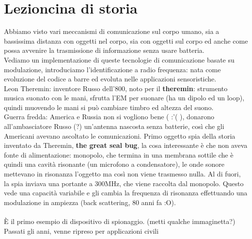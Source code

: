 \documentclass[oneside, 12pt]{extbook}
\begin{document}
\section{Lezioncina di storia}
Abbiamo visto vari meccanismi di comunicazione sul corpo umano, sia a bassissima distanza con oggetti nel corpo, sia con oggetti sul corpo ed anche come possa avvenire la trasmissione di informazione senza usare batteria.\\Vediamo un implementazione di queste tecnologie di comunicazione basate su modulazione, introduciamo l'identificazione a radio frequenza: nata come evoluzione del codice a barre ed evoluta nelle applicazioni sensoristiche.\\Leon Theremin: inventore Russo dell'800, noto per il \textbf{theremin}: strumento musica suonato con le mani, sfrutta l'EM per suonare (ha un dipolo ed un loop), quindi muovendo le mani si può cambiare timbro ed altezza del suono.\\Guerra fredda: America e Russia non si vogliono bene ( :'( ), donarono all'ambasciatore Russo (?) un'antenna nascosta senza batterie, così che gli Americani avevano ascoltato le comunicazioni. Primo oggetto spia della storia inventato da Theremin, \textbf{the great seal bug}, la cosa interessante è che non aveva fonte di alimentazione: monopolo, che termina in una membrana sottile che è quindi una cavità risonante (un microfono a condensatore), le onde sonore mettevano in risonanza l'oggetto ma così non viene trasmesso nulla. Al di fuori, la spia inviava una portante a 300MHz, che viene raccolta dal monopolo. Questo vede una capacità variabile e gli cambia la frequenza di risonanza effettuando una modulazione in ampiezza (back scattering, 80 anni fa :O).\\\\È il primo esempio di dispositivo di spionaggio. (metti qualche immaginetta?) \\Passati gli anni, venne ripreso per applicazioni civili
\end{document}
